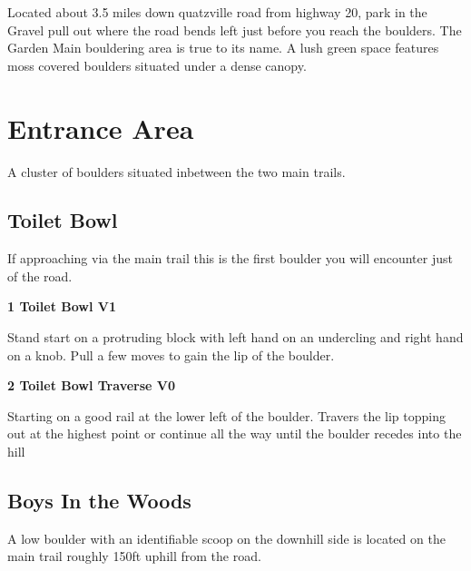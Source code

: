 \begin{multicols*}{2}

Located about 3.5 miles down quatzville road from highway 20, park in the Gravel pull out where the road bends left just before you reach the boulders. The Garden Main bouldering area is true to its name. A lush green space features moss covered boulders situated under a dense canopy.

		\section{Entrance Area}\label{sa:Entrance Area}
	A cluster of boulders situated inbetween the two main trails.
			\subsection*{Toilet Bowl}\label{bf:Toilet Bowl}
			If approaching via the main trail this is the first boulder you will encounter just of the road.
			

					\label{rt:Toilet Bowl} \colorbox{green!20}{\textbf{1 Toilet Bowl V1   }}
					\begin{adjustwidth}{1cm}{}
					Stand start on a protruding block with left hand on an undercling and right hand on a knob. Pull a few moves to gain the lip of the boulder.
					\end{adjustwidth}
					\label{rt:Toilet Bowl Traverse} \colorbox{green!20}{\textbf{2 Toilet Bowl Traverse V0 \ding{72}   }}
					\begin{adjustwidth}{1cm}{}
					Starting on a good rail at the lower left of the boulder. Travers the lip topping out at the highest point or continue all the way until the boulder recedes into the hill
					\end{adjustwidth}
			\subsection*{Boys In the Woods}\label{bf:Boys In the Woods}
			A low boulder with an identifiable scoop on the downhill side is located on the main trail roughly 150ft uphill from the road.
			

\end{multicols*}
